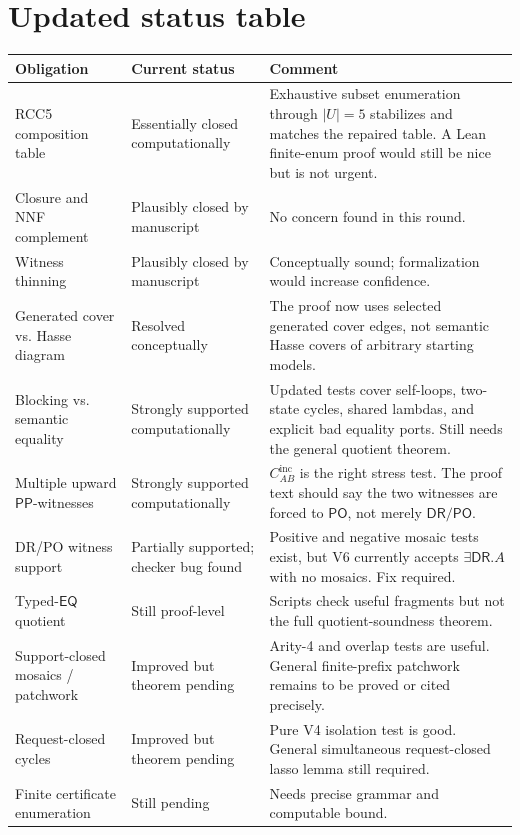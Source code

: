 \documentclass[11pt]{article}
\newcommand{\PP}{\mathsf{PP}}
\newcommand{\DR}{\mathsf{DR}}
\newcommand{\PO}{\mathsf{PO}}
\newcommand{\EQ}{\mathsf{EQ}}
\begin{document}
\section{Updated status table}

\begin{longtable}{>{\raggedright\arraybackslash}p{}>{\raggedright\arraybackslash}p{}>{\raggedright\arraybackslash}p{}}
\toprule
Obligation & Current status & Comment \\
\midrule
RCC5 composition table & Essentially closed computationally & Exhaustive subset enumeration through \(|U|=5\) stabilizes and matches the repaired table.  A Lean finite-enum proof would still be nice but is not urgent. \\
\addlinespace
Closure and NNF complement & Plausibly closed by manuscript & No concern found in this round. \\
\addlinespace
Witness thinning & Plausibly closed by manuscript & Conceptually sound; formalization would increase confidence. \\
\addlinespace
Generated cover vs. Hasse diagram & Resolved conceptually & The proof now uses selected generated cover edges, not semantic Hasse covers of arbitrary starting models. \\
\addlinespace
Blocking vs. semantic equality & Strongly supported computationally & Updated tests cover self-loops, two-state cycles, shared lambdas, and explicit bad equality ports.  Still needs the general quotient theorem. \\
\addlinespace
Multiple upward \(\PP\)-witnesses & Strongly supported computationally & \(C_{AB}^{\mathrm{inc}}\) is the right stress test.  The proof text should say the two witnesses are forced to \(\PO\), not merely \(\DR/\PO\). \\
\addlinespace
DR/PO witness support & Partially supported; checker bug found & Positive and negative mosaic tests exist, but V6 currently accepts \(\exists\DR.A\) with no mosaics.  Fix required. \\
\addlinespace
Typed-\(\EQ\) quotient & Still proof-level & Scripts check useful fragments but not the full quotient-soundness theorem. \\
\addlinespace
Support-closed mosaics / patchwork & Improved but theorem pending & Arity-4 and overlap tests are useful.  General finite-prefix patchwork remains to be proved or cited precisely. \\
\addlinespace
Request-closed cycles & Improved but theorem pending & Pure V4 isolation test is good.  General simultaneous request-closed lasso lemma still required. \\
\addlinespace
Finite certificate enumeration & Still pending & Needs precise grammar and computable bound. \\
\bottomrule
\end{longtable}
\end{document}
